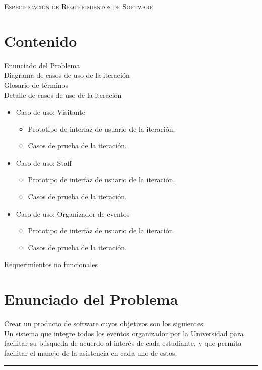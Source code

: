 \documentclass{article}
\begin{document}


\marginsize{2cm}{2cm}{1cm}{5cm}

\vspace*{9mm}
\begin{center}
  {\LARGE \scshape Especificación de Requerimientos de Software\vspace{10mm} }
\end{center}


\section{Contenido}
Enunciado del Problema\\
\indent Diagrama de casos de uso de la iteración\\
\indent Glosario de términos\\
\indent Detalle de casos de uso de la iteración\\

\begin{itemize}
\item Caso de uso: Visitante
  \begin{itemize}
  \item Prototipo de interfaz de usuario de la iteración.
  \item Casos de prueba de la iteración.
  \end{itemize}
\item Caso de uso: Staff
  \begin{itemize}
  \item Prototipo de interfaz de usuario de la iteración.
  \item Casos de prueba de la iteración.
  \end{itemize}
\item Caso de uso: Organizador de eventos
  \begin{itemize}
  \item Prototipo de interfaz de usuario de la iteración.
  \item Casos de prueba de la iteración.
  \end{itemize}
\end{itemize}
\indent \indent Requerimientos no funcionales\\
\newpage


\section{Enunciado del Problema}
Crear un producto de software cuyos objetivos son los siguientes:\\
Un sistema que integre todos los eventos organizador por la Universidad para
facilitar su búsqueda de acuerdo al interés de cada estudiante, y que permita
facilitar el manejo de la asistencia en cada uno de estos.\\
\rule{1\textwidth}{.8pt}\\
\end{document}
